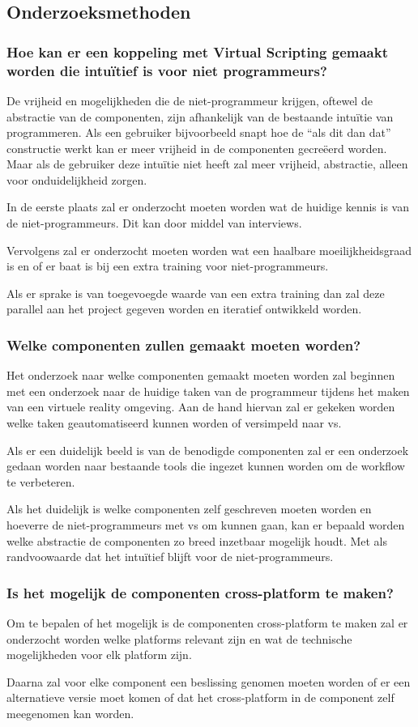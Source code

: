 \subsection{Onderzoeksmethoden}
\label{subsec:onderzoeksmethoden}

\subsubsection{Hoe kan er een koppeling met Virtual Scripting gemaakt worden die intuïtief is voor niet programmeurs?}

De vrijheid en mogelijkheden die de niet-programmeur krijgen, oftewel de abstractie van de componenten, zijn afhankelijk van de bestaande intuïtie van programmeren. Als een gebruiker bijvoorbeeld snapt hoe de “als dit dan dat” constructie werkt kan er meer vrijheid in de componenten gecreëerd worden. Maar als de gebruiker deze intuïtie niet heeft zal meer vrijheid, abstractie, alleen voor onduidelijkheid zorgen.

In de eerste plaats zal er onderzocht moeten worden wat de huidige kennis is van de niet-programmeurs. Dit kan door middel van interviews.

Vervolgens zal er onderzocht moeten worden wat een haalbare moeilijkheidsgraad is en of er baat is bij een extra training voor niet-programmeurs.

Als er sprake is van toegevoegde waarde van een extra training dan zal deze parallel aan het project gegeven worden en iteratief ontwikkeld worden.

\subsubsection{Welke componenten zullen gemaakt moeten worden?}
Het onderzoek naar welke componenten gemaakt moeten worden zal beginnen met een onderzoek naar de huidige taken van de programmeur tijdens het maken van een virtuele reality omgeving. Aan de hand hiervan zal er gekeken worden welke taken geautomatiseerd kunnen worden of versimpeld naar \gls{vs}.

Als er een duidelijk beeld is van de benodigde componenten zal er een onderzoek gedaan worden naar bestaande tools die ingezet kunnen worden om de workflow te verbeteren.

Als het duidelijk is welke componenten zelf geschreven moeten worden en hoeverre de niet-programmeurs met \gls{vs} om kunnen gaan, kan er bepaald worden welke abstractie de componenten zo breed inzetbaar mogelijk houdt. Met als randvoowaarde dat het intuïtief blijft voor de niet-programmeurs.

\subsubsection{Is het mogelijk de componenten cross-platform te maken?}
Om te bepalen of het mogelijk is de componenten cross-platform te maken zal er onderzocht worden welke platforms relevant zijn en wat de technische mogelijkheden voor elk platform zijn.

Daarna zal voor elke component een beslissing genomen moeten worden of er een alternatieve versie moet komen of dat het cross-platform in de component zelf meegenomen kan worden.
